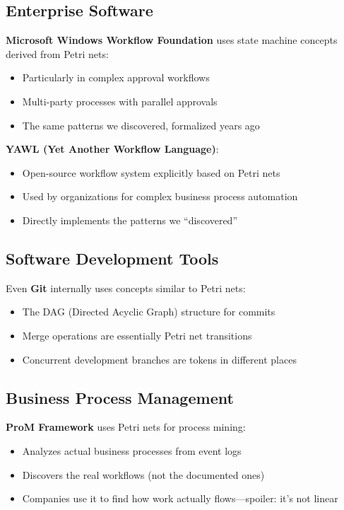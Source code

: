\documentclass[11pt,a4paper]{article}
\begin{document}
\subsection{Enterprise Software}
\textbf{Microsoft Windows Workflow Foundation} uses state machine concepts derived from Petri nets:
\begin{itemize}
\item Particularly in complex approval workflows
\item Multi-party processes with parallel approvals
\item The same patterns we discovered, formalized years ago
\end{itemize}

\textbf{YAWL (Yet Another Workflow Language)}:
\begin{itemize}
\item Open-source workflow system explicitly based on Petri nets
\item Used by organizations for complex business process automation
\item Directly implements the patterns we ``discovered''
\end{itemize}

\subsection{Software Development Tools}
Even \textbf{Git} internally uses concepts similar to Petri nets:
\begin{itemize}
\item The DAG (Directed Acyclic Graph) structure for commits
\item Merge operations are essentially Petri net transitions
\item Concurrent development branches are tokens in different places
\end{itemize}

\subsection{Business Process Management}
\textbf{ProM Framework} uses Petri nets for process mining:
\begin{itemize}
\item Analyzes actual business processes from event logs
\item Discovers the real workflows (not the documented ones)
\item Companies use it to find how work actually flows—spoiler: it's not linear
\end{itemize}
\end{document}
